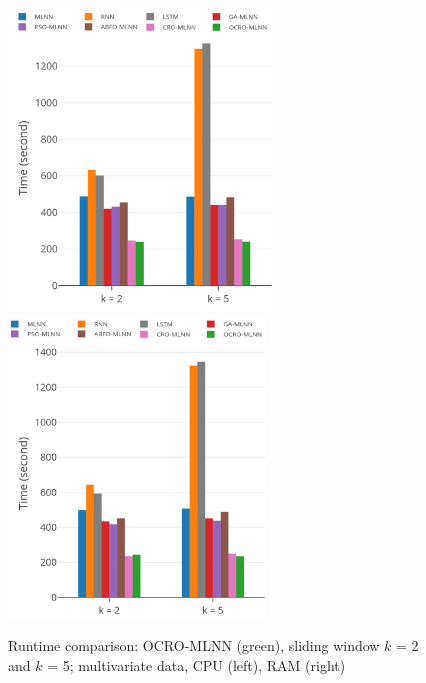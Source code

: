 \documentclass[11pt,twoside]{article}
\begin{document}
\begin{multicols}{2}
\begin{figure}[!t]
	\centering
	\begin{minipage}[t]{1.0\textwidth}
		\centering
		\includegraphics[width=0.45\textwidth =0cm 0cm 0cm 0cm, height = 8cm]{time/time_cpu.pdf}
		\centering
		\includegraphics[width=0.45\textwidth =0cm 0cm 0cm 0cm, height = 8cm]{time/time_ram.pdf}
	\end{minipage}
	\caption{Runtime comparison: OCRO-MLNN (green), sliding window $k$ = 2 and $k$ = 5; multivariate data, CPU (left), RAM (right)} 
	\label{fig:speed_system_multivariate}
\end{figure}


\end{multicols}
\end{document}

